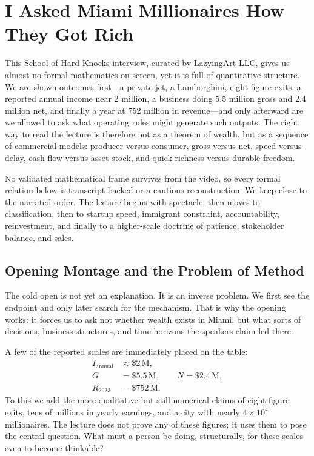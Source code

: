 \chapter{I Asked Miami Millionaires How They Got Rich}

This School of Hard Knocks interview, curated by LazyingArt LLC, gives us almost no formal mathematics on screen, yet it is full of quantitative structure. We are shown outcomes first---a private jet, a Lamborghini, eight-figure exits, a reported annual income near \text{\$}2 million, a business doing \text{\$}5.5 million gross and \text{\$}2.4 million net, and finally a year at \text{\$}752 million in revenue---and only afterward are we allowed to ask what operating rules might generate such outputs. The right way to read the lecture is therefore not as a theorem of wealth, but as a sequence of commercial models: producer versus consumer, gross versus net, speed versus delay, cash flow versus asset stock, and quick richness versus durable freedom.

No validated mathematical frame survives from the video, so every formal relation below is transcript-backed or a cautious reconstruction. We keep close to the narrated order. The lecture begins with spectacle, then moves to classification, then to startup speed, immigrant constraint, accountability, reinvestment, and finally to a higher-scale doctrine of patience, stakeholder balance, and sales.

\section{Opening Montage and the Problem of Method}

The cold open is not yet an explanation. It is an inverse problem. We first see the endpoint and only later search for the mechanism. That is why the opening works: it forces us to ask not whether wealth exists in Miami, but what sorts of decisions, business structures, and time horizons the speakers claim led there.

A few of the reported scales are immediately placed on the table:
\begin{align}
I_{\mathrm{annual}} &\approx \text{\$}2\,\mathrm{M},\\
G &= \text{\$}5.5\,\mathrm{M},\qquad N = \text{\$}2.4\,\mathrm{M},\\
R_{2023} &= \text{\$}752\,\mathrm{M}.
\end{align}
To this we add the more qualitative but still numerical claims of eight-figure exits, tens of millions in yearly earnings, and a city with nearly \(4\times 10^4\) millionaires. The lecture does not prove any of these figures; it uses them to pose the central question. What must a person be doing, structurally, for these scales even to become thinkable?

